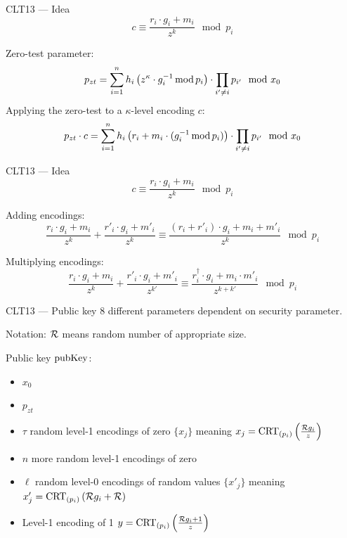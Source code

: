\documentclass[english]{beamer}
\begin{document}
    \begin{frame}{CLT13 --- Idea}
        \begin{equation*}
            c \equiv \frac{r_i \cdot g_i + m_i}{z^k} \mod p_i
        \end{equation*}

        Zero-test parameter:
        \begin{equation*}
            p_{zt} = \sum_{i=1}^n h_i \left(z^\kappa \cdot g_i^{-1} \operatorname{mod} p_i\right) \cdot \prod_{i' \neq i} p_{i'} \mod x_0
        \end{equation*}
        \pause
        Applying the zero-test to a $\kappa$-level encoding $c$:
        \begin{equation*}
            p_{zt} \cdot c = \sum_{i=1}^n h_i \left(r_i + m_i \cdot (g_i^{-1} \operatorname{mod} p_i)\right) \cdot \prod_{i' \neq i} p_{i'} \mod x_0
        \end{equation*}
    \end{frame}
    \begin{frame}{CLT13 --- Idea}
        \begin{equation*}
            c \equiv \frac{r_i \cdot g_i + m_i}{z^k} \mod p_i
        \end{equation*}

        Adding encodings:
        \begin{equation*}
            \frac{r_i \cdot g_i + m_i}{z^k} + \frac{r'_i \cdot g_i + m'_i}{z^k} \equiv \frac{(r_i + r'_i) \cdot g_i + m_i + m'_i}{z^k} \mod p_i
        \end{equation*}

        Multiplying encodings:
        \begin{equation*}
            \frac{r_i \cdot g_i + m_i}{z^k} + \frac{r'_i \cdot g_i + m'_i}{z^{k'}} \equiv \frac{r^\dagger_i \cdot g_i + m_i \cdot m'_i}{z^{k + k'}} \mod p_i
        \end{equation*}
    \end{frame}
    \begin{frame}{CLT13 --- Public key}
        8 different parameters dependent on security parameter.

        Notation: $\mathcal{R}$ means random number of appropriate size.

        Public key $\mathrm{pubKey}$:
        \begin{itemize}
            \item $x_0$
            \item $p_{zt}$
            \item $\tau$ random level-1 encodings of zero $\{x_j\}$ meaning $x_j = \operatorname{CRT}_{(p_{i})}\left(\frac{\mathcal{R} g_i}{z}\right)$
            \item $n$ more random level-1 encodings of zero
            \item $\ell$ random level-0 encodings of random values $\{x'_j\}$ meaning $x'_j = \operatorname{CRT}_{(p_{i})}\left(\mathcal{R} g_i + \mathcal{R}\right)$
            \item Level-1 encoding of 1 $y = \operatorname{CRT}_{(p_{i})}\left(\frac{\mathcal{R} g_i + 1}{z}\right)$
        \end{itemize}
    \end{frame}
\end{document}

